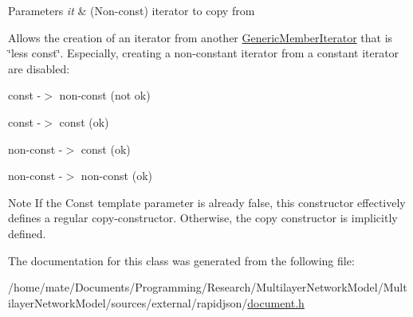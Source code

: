 \begin{DoxyParams}{Parameters}
{\em it} & (Non-\/const) iterator to copy from\\
\hline
\end{DoxyParams}
Allows the creation of an iterator from another \hyperlink{classGenericMemberIterator}{Generic\+Member\+Iterator} that is \char`\"{}less const\char`\"{}. Especially, creating a non-\/constant iterator from a constant iterator are disabled\+: \begin{DoxyItemize}
\item const -\/$>$ non-\/const (not ok) \item const -\/$>$ const (ok) \item non-\/const -\/$>$ const (ok) \item non-\/const -\/$>$ non-\/const (ok)\end{DoxyItemize}
\begin{DoxyNote}{Note}
If the {\ttfamily Const} template parameter is already {\ttfamily false}, this constructor effectively defines a regular copy-\/constructor. Otherwise, the copy constructor is implicitly defined. 
\end{DoxyNote}


The documentation for this class was generated from the following file\+:\begin{DoxyCompactItemize}
\item 
/home/mate/\+Documents/\+Programming/\+Research/\+Multilayer\+Network\+Model/\+Multilayer\+Network\+Model/sources/external/rapidjson/\hyperlink{document_8h}{document.\+h}\end{DoxyCompactItemize}
